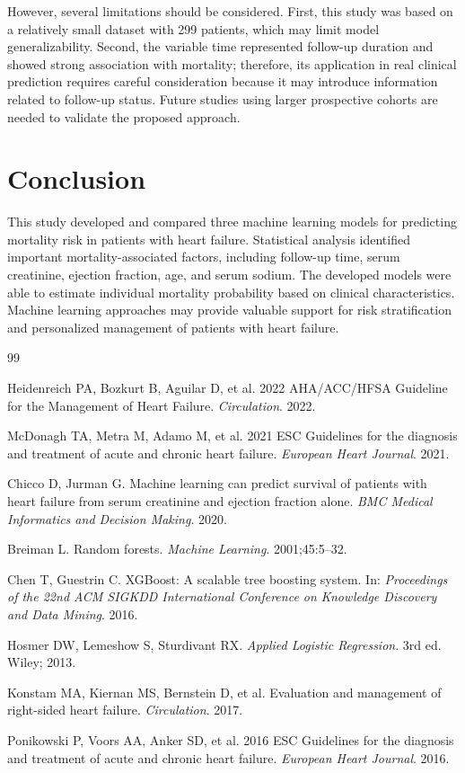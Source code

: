 \documentclass[11pt]{article}
\begin{document}
However, several limitations should be considered. First, this study was based
on a relatively small dataset with 299 patients, which may limit model
generalizability. Second, the variable time represented follow-up duration and
showed strong association with mortality; therefore, its application in real
clinical prediction requires careful consideration because it may introduce
information related to follow-up status. Future studies using larger
prospective cohorts are needed to validate the proposed approach.


\section{Conclusion}


This study developed and compared three machine learning models for predicting
mortality risk in patients with heart failure. Statistical analysis identified
important mortality-associated factors, including follow-up time, serum
creatinine, ejection fraction, age, and serum sodium. The developed models were
able to estimate individual mortality probability based on clinical
characteristics. Machine learning approaches may provide valuable support for
risk stratification and personalized management of patients with heart failure.

\newpage

\begin{thebibliography}{99}


Heidenreich PA, Bozkurt B, Aguilar D, et al.
2022 AHA/ACC/HFSA Guideline for the Management of Heart Failure.
\textit{Circulation}. 2022.


McDonagh TA, Metra M, Adamo M, et al.
2021 ESC Guidelines for the diagnosis and treatment of acute and chronic heart failure.
\textit{European Heart Journal}. 2021.


Chicco D, Jurman G.
Machine learning can predict survival of patients with heart failure from serum
creatinine and ejection fraction alone.
\textit{BMC Medical Informatics and Decision Making}. 2020.


Breiman L.
Random forests.
\textit{Machine Learning}. 2001;45:5--32.


Chen T, Guestrin C.
XGBoost: A scalable tree boosting system.
In:
\textit{Proceedings of the 22nd ACM SIGKDD International Conference on Knowledge Discovery and Data Mining}.
2016.


Hosmer DW, Lemeshow S, Sturdivant RX.
\textit{Applied Logistic Regression}.
3rd ed.
Wiley; 2013.


Konstam MA, Kiernan MS, Bernstein D, et al.
Evaluation and management of right-sided heart failure.
\textit{Circulation}. 2017.


Ponikowski P, Voors AA, Anker SD, et al.
2016 ESC Guidelines for the diagnosis and treatment of acute and chronic heart failure.
\textit{European Heart Journal}. 2016.


\end{thebibliography}
\end{document}
